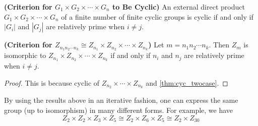 \documentclass{article}
\newcommand{\bfs}[1]{\textbf{({#1}) }}
\begin{document}
\begin{cora}\bfs{Criterion for $G_{1} \times G_{2} \times \cdots \times G_{n}$ to Be Cyclic}
An external direct product $G_{1} \times G_{2} \times \cdots \times G_{n}$ of a finite number of finite cyclic groups is cyclic if and only if $\left|G_{i}\right|$ and $\left|G_{j}\right|$ are relatively prime when $i \neq j$.
\end{cora}
\begin{cora}\bfs{Criterion for $Z_{n_{1} n_{2} \cdots n_{k}} \cong Z_{n_{1}} \times Z_{n_{2}} \times \cdots \times Z_{n_{k}}$}\label{cor:odmnfafgxz}
Let $m=n_{1} n_{2} \cdots n_{k}$. Then $Z_{m}$ is isomorphic to $Z_{n_{1}} \times Z_{n_{2}} \times \cdots \times Z_{n_{k}}$ if and only if $n_{i}$ and $n_{j}$ are relatively prime when $i \neq j$.
\end{cora}
\begin{proof}
This is because cyclic of $Z_{n_{2}} \times \cdots \times Z_{n_{k}}$ and \cref{thm:cyc_twocase}.
\end{proof}
\begin{exma}
By using the results above in an iterative fashion, one can express the same group (up to isomorphism) in many different forms. For example, we have
$$
Z_{2} \times Z_{2} \times Z_{3} \times Z_{5} \cong Z_{2} \times Z_{6} \times Z_{5} \cong Z_{2} \times Z_{30}
$$
\end{exma}
\end{document}
